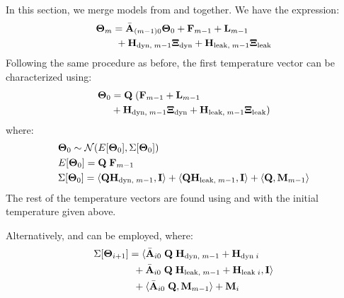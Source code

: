 In this section, we merge models from  and  together. We have the expression:
\begin{align*}
  & \mathbf{\Theta}_{m} = \Bar{\mathbf{A}}_{(m - 1)0} \mathbf{\Theta}_0 + \mathbf{F}_{m - 1} + \mathbf{L}_{m - 1} \\
  & {} \qquad + \mathbf{H}_{\text{dyn}, \; m - 1} \mathbf{\Xi}_{\text{dyn}} + \mathbf{H}_{\text{leak}, \; m - 1} \mathbf{\Xi}_{\text{leak}}
\end{align*}
Following the same procedure as before, the first temperature vector can be characterized using:
\begin{align*}
  \mathbf{\Theta}_0 & = \mathbf{Q} \; (\mathbf{F}_{m - 1} + \mathbf{L}_{m - 1} \\
  & {} + \mathbf{H}_{\text{dyn}, \; m - 1} \mathbf{\Xi}_{\text{dyn}} + \mathbf{H}_{\text{leak}, \; m - 1} \mathbf{\Xi}_{\text{leak}})
\end{align*}
where:
\begin{align*}
  & \mathbf{\Theta}_0 \sim \mathcal{N}(E[\mathbf{\Theta}_0], \Sigma[\mathbf{\Theta}_0]) \\
  & E[\mathbf{\Theta}_0] = \mathbf{Q} \; \mathbf{F}_{m - 1} \\
  & \Sigma[\mathbf{\Theta}_0] = \langle \mathbf{Q} \mathbf{H}_{\text{dyn}, \; m - 1}, \mathbf{I} \rangle + \langle \mathbf{Q} \mathbf{H}_{\text{leak}, \; m - 1}, \mathbf{I} \rangle + \langle \mathbf{Q}, \mathbf{M}_{m - 1} \rangle
\end{align*}
The rest of the temperature vectors are found using  and  with the initial temperature given above.

Alternatively,  and  can be employed, where:
\begin{align*}
  & \Sigma[\mathbf{\Theta}_{i + 1}] = \langle \Bar{\mathbf{A}}_{i0} \; \mathbf{Q} \; \mathbf{H}_{\text{dyn}, \; m - 1} + \mathbf{H}_{\text{dyn} \; i} \\
  & { } \qquad \qquad + \Bar{\mathbf{A}}_{i0} \; \mathbf{Q} \; \mathbf{H}_{\text{leak}, \; m - 1} + \mathbf{H}_{\text{leak} \; i}, \mathbf{I} \rangle \\
  & { } \qquad \qquad + \langle \Bar{\mathbf{A}}_{i0} \; \mathbf{Q}, \mathbf{M}_{m - 1} \rangle + \mathbf{M}_i
\end{align*}

